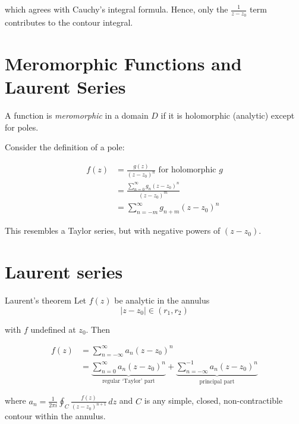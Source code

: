 \documentclass{physics_notes}
\begin{document}

which agrees with Cauchy's integral formula. Hence, only the $\frac{1}{z - z_0}$ term contributes to the contour integral. 

\section{Meromorphic Functions and Laurent Series}

A function is \emph{meromorphic} in a domain $D$ if it is holomorphic (analytic) except for poles. 

Consider the definition of a pole:

\begin{align*}
f(z) &= \frac{g(z)}{(z - z_0)^n} \text{ for holomorphic } g \\
&= \frac{\sum^\infty_{n=0}g_n (z-z_0)^n}{(z-z_0)^m} \\
&= \sum_{n=-m}^\infty g_{n+m} (z - z_0)^n
\end{align*}

This resembles a Taylor series, but with negative powers of $(z-z_0)$.

\section{Laurent series }

\begin{theorem}{Laurent's theorem}
Let $f(z)$ be analytic in the annulus
\[ {|z-z_0| \in (r_1 , r_2)} \]

with $f$ undefined at $z_0$. Then

\begin{align*}
f(z) &= \sum_{n=-\infty}^\infty a_n (z-z_0)^n \\
&= \underbrace{\sum_{n=0}^\infty a_n (z-z_0)^n}_\text{regular `Taylor' part} + \underbrace{\sum_{n=-\infty}^{-1} a_{n}(z-z_0)^n}_\text{principal part}
\end{align*}

where $a_n = \frac{1}{2\pi i} \oint_C \frac{f(z)}{(z-z_0)^{n+1}}\, dz$ and $C$ is any simple, closed, non-contractible contour within the annulus.

\end{theorem}
\end{document}
